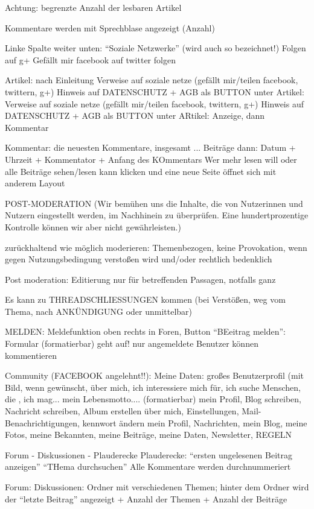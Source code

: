 Achtung: begrenzte Anzahl der lesbaren Artikel

Kommentare werden mit Sprechblase angezeigt (Anzahl)

Linke Spalte weiter unten: ``Soziale Netzwerke'' (wird auch so bezeichnet!)
Folgen auf g+
Gefällt mir facebook
auf twitter folgen 

Artikel: nach Einleitung Verweise auf soziale netze (gefällt mir/teilen facebook, twittern, g+) 
Hinweis auf DATENSCHUTZ + AGB als BUTTON
unter Artikel: Verweise auf soziale netze (gefällt mir/teilen facebook, twittern, g+) 
Hinweis auf DATENSCHUTZ + AGB als BUTTON
unter ARtikel: Anzeige, dann Kommentar

Kommentar: die neuesten Kommentare, insgesamt ... Beiträge
dann: Datum + Uhrzeit + Kommentator + Anfang des KOmmentars
Wer mehr lesen will oder alle Beiträge sehen/lesen kann klicken und eine neue Seite öffnet sich mit anderem Layout

POST-MODERATION (Wir bemühen uns die Inhalte, die von Nutzerinnen und Nutzern eingestellt werden, im Nachhinein zu überprüfen. Eine hundertprozentige Kontrolle können wir aber nicht gewährleisten.)

zurückhaltend wie möglich moderieren: Themenbezogen, keine Provokation, wenn gegen Nutzungsbedingung verstoßen wird und/oder rechtlich bedenklich

Post moderation: Editierung nur für betreffenden Passagen, notfalls ganz

Es kann zu THREADSCHLIESSUNGEN kommen (bei Verstößen, weg vom Thema, nach ANKÜNDIGUNG oder unmittelbar)

MELDEN: Meldefunktion oben rechts in Foren, Button ``BEeitrag melden'': Formular (formatierbar) geht auf! nur angemeldete Benutzer können kommentieren

Community (FACEBOOK angelehnt!!): Meine Daten: großes Benutzerprofil (mit Bild, wenn gewünscht, über mich, ich interessiere mich für, ich suche Menschen, die , ich mag... mein Lebensmotto.... (formatierbar)
mein Profil, Blog schreiben, Nachricht schreiben, Album erstellen 
über mich, Einstellungen, Mail-Benachrichtigungen, kennwort ändern
mein Profil, Nachrichten, mein Blog, meine Fotos, meine Bekannten, meine Beiträge, meine Daten, Newsletter, REGELN


Forum - Diskussionen - Plauderecke
Plauderecke:
``ersten ungelesenen Beitrag anzeigen'' ``THema durchsuchen''
Alle Kommentare werden durchnummeriert

Forum: 
Diskussionen: Ordner mit verschiedenen Themen; hinter dem Ordner wird der ``letzte Beitrag'' angezeigt + Anzahl der Themen + Anzahl der Beiträge


